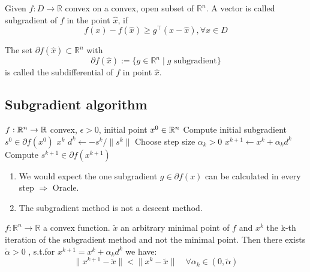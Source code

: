 \begin{definition}
	Given $f: D \longrightarrow \mathbb{R}$ convex on a convex, open subset of $\mathbb{R}^n$. A vector is called subgradient of $f$ in the point $\hat{x}$, if
	\begin{equation}
		f(x) - f(\hat{x}) \geq g^\top(x-\hat{x}), \forall x \in D
	\end{equation}
	
	The set $\partial f(\hat{x}) \subset \mathbb{R}^n$ with 
	\begin{equation*}
		\partial f(\hat{x}) := \{g \in \mathbb{R}^n \mid g \text{ subgradient}\}
	\end{equation*}
	is called the subdifferential of $f$ in point $\hat{x}$.
\end{definition}

\subsection{Subgradient algorithm}
\begin{algorithm}
\caption{Subgradient method}
\begin{algorithmic}[1]
\Require $f:\mathbb{R}^n \to \mathbb{R}$ convex, $\epsilon > 0$, initial point $x^0 \in \mathbb{R}^n$
\State Compute initial subgradient $s^0 \in \partial f(x^0)$
    \State \Return $x^k$
  \EndIf
  \State $d^k \gets -s^k / \|s^k\|$
  \State Choose step size $\alpha_k > 0$
  \State $x^{k+1} \gets x^k + \alpha_k d^k$
  \State Compute $s^{k+1} \in \partial f(x^{k+1})$
\EndFor
\end{algorithmic}
\end{algorithm}

\begin{remark}\quad
	\begin{enumerate}
		\item We would expect the one subgradient $g \in \partial f(x)$ can be calculated in every step $\Rightarrow$ Oracle.
		\item The subgradient method is not a descent method.
	\end{enumerate}
\end{remark}


\begin{lemma}
	$f : \mathbb{R}^n \longrightarrow \mathbb{R}$ a convex function. $\tilde{x}$ an arbitrary minimal point of $f$ and $x^k$ the k-th iteration of the subgradient method and not the minimal point. Then there exists $\tilde{\alpha} > 0$ , s.t.for $x^{k + 1} = x^{k} + \alpha_k d^k$ we have:
		\begin{equation*}
			\| x^{k + 1} - \tilde{x} \|  < \| x^k - \tilde{x} \| \quad \forall \alpha_k \in (0, \tilde{\alpha})
		\end{equation*}
\end{lemma}

